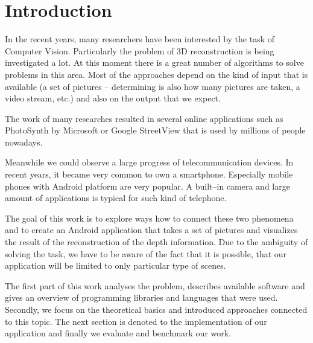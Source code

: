 \chapter*{Introduction}
In the recent years, many researchers have been interested by the task of Computer Vision. 
Particularly the problem of 3D reconstruction is being investigated a lot. 
At this moment there is a great number of algorithms to solve problems in this area. 
Most of the approaches depend on the kind of input that is available (a set of pictures – determining is also how many pictures are taken, a video stream, etc.) and also on the output that we expect.

The work of many researches resulted in several online applications such as PhotoSynth by Microsoft or 
Google StreetView that is used by millions of people nowadays.

Meanwhile we could observe a large progress of telecommunication devices. 
In recent years, it became very common to own a smartphone. 
Especially mobile phones with Android platform are very popular. 
A built–in camera and large amount of applications is typical for such kind of telephone.

The goal of this work is to explore ways how to connect these two phenomena and to create an Android application that takes a set of pictures and visualizes the result of the reconstruction of the depth information. 
Due to the ambiguity of solving the task, we have to be aware of the fact that it is possible, that our application will be limited to only particular type of scenes. 

The first part of this work analyses the problem, describes available software and gives an overview of programming libraries and languages that were used. 
Secondly, we focus on the theoretical basics and introduced approaches connected to this topic.
The next section is denoted to the implementation of our application and finally we evaluate and benchmark our work.


